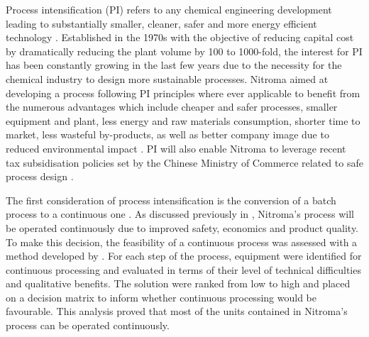 Process intensification (PI) refers to any chemical engineering development leading to substantially smaller, cleaner, safer and more energy efficient technology \cite{reay_chapter_2008}. Established in the 1970s with the objective of reducing capital cost by dramatically reducing the plant volume by 100 to 1000-fold, the interest for PI has been constantly growing in the last few years due to the necessity for the chemical industry to design more sustainable processes. Nitroma aimed at developing a process following PI principles where ever applicable to benefit from the numerous advantages which include cheaper and safer processes, smaller equipment and plant, less energy and raw materials consumption, shorter time to market, less wasteful by-products, as well as better company image due to reduced environmental impact \cite{reay_chapter_2008}. PI will also enable Nitroma to leverage recent tax subsidisation policies set by the Chinese Ministry of Commerce related to safe process design \cite{nanjing_economic_and_technological_development_zone_administration_committee_public_2019}.  

The first consideration of process intensification is the conversion of a batch process to a continuous one \cite{randall_process_2020}. As discussed previously in , Nitroma's process will be operated continuously due to improved safety, economics and product quality. To make this decision, the feasibility of a continuous process was assessed with a method developed by \textcite{teoh_practical_2016}. For each step of the process, equipment were  identified for continuous processing and evaluated in terms of their level of technical difficulties and qualitative benefits. The solution were ranked from low to high and placed on a decision matrix to inform whether continuous processing would be favourable. This analysis proved that most of the units contained in Nitroma's process can be operated continuously.

